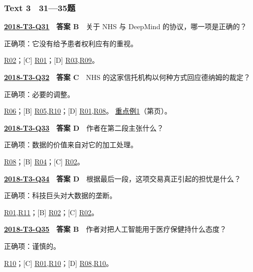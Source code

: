 \documentclass[11pt,a4paper]{article}
\begin{document}
\subsubsection{Text 3　31—35题}
\label{idx-2018-T3-Q31}
\noindent\textbf{\href{https://zj139.github.io/math-notes/english/b56b3f9f18dc5d2535e35b75/\#q31}{2018-T3-Q31}　答案 B}　关于 NHS 与 DeepMind 的协议，哪一项是正确的？\par\nopagebreak
\noindent 正确项：它没有给予患者权利应有的重视。\par\nopagebreak
\noindent [A] \hyperref[cat-R02]{R02}；[C] \hyperref[cat-R01]{R01}；[D] \hyperref[cat-R03]{R03},\hyperref[cat-R09]{R09}。
\par\smallskip
{}\label{idx-2018-T3-Q32}
\noindent\textbf{\href{https://zj139.github.io/math-notes/english/b56b3f9f18dc5d2535e35b75/\#q32}{2018-T3-Q32}　答案 C}　NHS 的这家信托机构以何种方式回应德纳姆的裁定？\par\nopagebreak
\noindent 正确项：必要的调整。\par\nopagebreak
\noindent [A] \hyperref[cat-R06]{R06}；[B] \hyperref[cat-R05]{R05},\hyperref[cat-R10]{R10}；[D] \hyperref[cat-R01]{R01},\hyperref[cat-R08]{R08}。
\hyperref[case-2018-T3-Q32]{重点例1}（第\pageref{case-2018-T3-Q32}页）。
\par\smallskip
{}\label{idx-2018-T3-Q33}
\noindent\textbf{\href{https://zj139.github.io/math-notes/english/b56b3f9f18dc5d2535e35b75/\#q33}{2018-T3-Q33}　答案 D}　作者在第二段主张什么？\par\nopagebreak
\noindent 正确项：数据的价值来自对它的加工处理。\par\nopagebreak
\noindent [A] \hyperref[cat-R08]{R08}；[B] \hyperref[cat-R04]{R04}；[C] \hyperref[cat-R02]{R02}。
\par\smallskip
{}\label{idx-2018-T3-Q34}
\noindent\textbf{\href{https://zj139.github.io/math-notes/english/b56b3f9f18dc5d2535e35b75/\#q34}{2018-T3-Q34}　答案 D}　根据最后一段，这项交易真正引起的担忧是什么？\par\nopagebreak
\noindent 正确项：科技巨头对大数据的垄断。\par\nopagebreak
\noindent [A] \hyperref[cat-R01]{R01},\hyperref[cat-R11]{R11}；[B] \hyperref[cat-R02]{R02}；[C] \hyperref[cat-R02]{R02}。
\par\smallskip
{}\label{idx-2018-T3-Q35}
\noindent\textbf{\href{https://zj139.github.io/math-notes/english/b56b3f9f18dc5d2535e35b75/\#q35}{2018-T3-Q35}　答案 B}　作者对把人工智能用于医疗保健持什么态度？\par\nopagebreak
\noindent 正确项：谨慎的。\par\nopagebreak
\noindent [A] \hyperref[cat-R10]{R10}；[C] \hyperref[cat-R01]{R01},\hyperref[cat-R10]{R10}；[D] \hyperref[cat-R08]{R08},\hyperref[cat-R10]{R10}。
\par\smallskip
\end{document}
